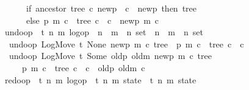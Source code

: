 \documentclass[sigconf]{acmart}
\renewcommand{\isacartoucheopen}{}
\renewcommand{\isacartoucheclose}{}
\begin{document}
\begin{figure}
\begin{isabellebody}
\ \ \ \ \ \ if\ ancestor\ tree\ c\ newp\ {\isasymor}\ c\ {\isacharequal}\ newp\ then\ tree\isanewline
\ \ \ \ \ \ else\ {\isacharbraceleft}{\isacharparenleft}p{\isacharprime}{\isacharcomma}\ m{\isacharprime}{\isacharcomma}\ c{\isacharprime}{\isacharparenright}\ {\isasymin}\ tree{\isachardot}\ c{\isacharprime}\ {\isasymnoteq}\ c{\isacharbraceright}\ {\isasymunion}\ {\isacharbraceleft}{\isacharparenleft}newp{\isacharcomma}\ m{\isacharcomma}\ c{\isacharparenright}{\isacharbraceright}{\isacharparenright}{\isacartoucheclose}\isanewline
\isanewline
{}\isamarkupfalse%
\ undo{\isacharunderscore}op\ {\isacharcolon}{\isacharcolon}\ {\isacartoucheopen}{\isacharparenleft}{\isacharprime}t{\isacharcomma}\ {\isacharprime}n{\isacharcomma}\ {\isacharprime}m{\isacharparenright}\ log{\isacharunderscore}op\ {\isasymtimes}\ {\isacharparenleft}{\isacharprime}n\ {\isasymtimes}\ {\isacharprime}m\ {\isasymtimes}\ {\isacharprime}n{\isacharparenright}\ set\ {\isasymRightarrow}\ {\isacharparenleft}{\isacharprime}n\ {\isasymtimes}\ {\isacharprime}m\ {\isasymtimes}\ {\isacharprime}n{\isacharparenright}\ set{\isacartoucheclose}\ \isanewline
\ \ {\isacartoucheopen}undo{\isacharunderscore}op\ {\isacharparenleft}LogMove\ t\ None\ newp\ m\ c{\isacharcomma}\ tree{\isacharparenright}\ {\isacharequal}\ {\isacharbraceleft}{\isacharparenleft}p{\isacharprime}{\isacharcomma}\ m{\isacharprime}{\isacharcomma}\ c{\isacharprime}{\isacharparenright}\ {\isasymin}\ tree{\isachardot}\ c{\isacharprime}\ {\isasymnoteq}\ c{\isacharbraceright}{\isacartoucheclose}\ {\isacharbar}\isanewline
\ \ {\isacartoucheopen}undo{\isacharunderscore}op\ {\isacharparenleft}LogMove\ t\ {\isacharparenleft}Some\ {\isacharparenleft}oldp{\isacharcomma}\ oldm{\isacharparenright}{\isacharparenright}\ newp\ m\ c{\isacharcomma}\ tree{\isacharparenright}\ {\isacharequal}\isanewline
\ \ \ \ \ {\isacharbraceleft}{\isacharparenleft}p{\isacharprime}{\isacharcomma}\ m{\isacharprime}{\isacharcomma}\ c{\isacharprime}{\isacharparenright}\ {\isasymin}\ tree{\isachardot}\ c{\isacharprime}\ {\isasymnoteq}\ c{\isacharbraceright}\ {\isasymunion}\ {\isacharbraceleft}{\isacharparenleft}oldp{\isacharcomma}\ oldm{\isacharcomma}\ c{\isacharparenright}{\isacharbraceright}{\isacartoucheclose}\isanewline
\isanewline
{}\isamarkupfalse%
\ redo{\isacharunderscore}op\ {\isacharcolon}{\isacharcolon}\ {\isacartoucheopen}{\isacharparenleft}{\isacharprime}t{\isacharcomma}\ {\isacharprime}n{\isacharcomma}\ {\isacharprime}m{\isacharparenright}\ log{\isacharunderscore}op\ {\isasymRightarrow}\ {\isacharparenleft}{\isacharprime}t{\isacharcomma}\ {\isacharprime}n{\isacharcomma}\ {\isacharprime}m{\isacharparenright}\ state\ {\isasymRightarrow}\ {\isacharparenleft}{\isacharprime}t{\isacharcomma}\ {\isacharprime}n{\isacharcomma}\ {\isacharprime}m{\isacharparenright}\ state{\isacartoucheclose}\ \isanewline

\end{isabellebody}
\end{figure}
\end{document}
